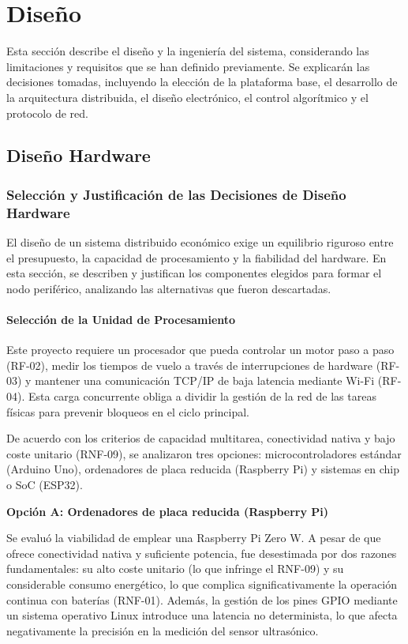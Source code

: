 \chapter{Diseño}
\label{chap:disenyo}

Esta sección describe el diseño y la ingeniería del sistema, considerando las limitaciones y requisitos que se han definido previamente. Se explicarán las decisiones tomadas, incluyendo la elección de la plataforma base, el desarrollo de la arquitectura distribuida, el diseño electrónico, el control algorítmico y el protocolo de red.

\section{Diseño Hardware}

\subsection{Selección y Justificación de las Decisiones de Diseño Hardware}

El diseño de un sistema distribuido económico exige un equilibrio riguroso entre el presupuesto, la capacidad de procesamiento y la fiabilidad del hardware. En esta sección, se describen y justifican los componentes elegidos para formar el nodo periférico, analizando las alternativas que fueron descartadas.

\subsubsection*{Selección de la Unidad de Procesamiento}

Este proyecto requiere un procesador que pueda controlar un motor paso a paso (RF-02), medir los tiempos de vuelo a través de interrupciones de hardware (RF-03) y mantener una comunicación TCP/IP de baja latencia mediante Wi-Fi (RF-04). Esta carga concurrente obliga a dividir la gestión de la red de las tareas físicas para prevenir bloqueos en el ciclo principal.

De acuerdo con los criterios de capacidad multitarea, conectividad nativa y bajo coste unitario (RNF-09), se analizaron tres opciones: microcontroladores estándar (Arduino Uno), ordenadores de placa reducida (Raspberry Pi) y sistemas en chip o SoC (ESP32).

\textbf{Opción A: Ordenadores de placa reducida (Raspberry Pi)}

Se evaluó la viabilidad de emplear una Raspberry Pi Zero W. A pesar de que ofrece conectividad nativa y suficiente potencia, fue desestimada por dos razones fundamentales: su alto coste unitario (lo que infringe el RNF-09) y su considerable consumo energético, lo que complica significativamente la operación continua con baterías (RNF-01). Además, la gestión de los pines GPIO mediante un sistema operativo Linux introduce una latencia no determinista, lo que afecta negativamente la precisión en la medición del sensor ultrasónico.

